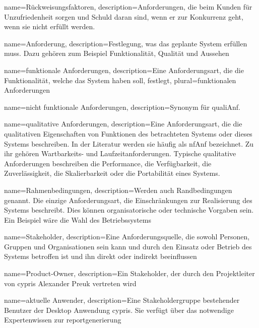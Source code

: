  {
	name=R\"uckweisungsfaktoren,
	description={Anforderungen, die beim Kunden f\"ur Unzufriedenheit sorgen und Schuld daran sind, wenn er zur Konkurrenz geht, wenn sie nicht erf\"ullt werden.}}

 {
	name=Anforderung,
	description={Festlegung, was das geplante System erf\"ullen muss. Dazu geh\"oren zum Beispiel Funktionalit\"at, Qualit\"at und Aussehen}}
	
 {
	name=funktionale Anforderungen,
	description={Eine Anforderungsart, die die Funktionalit\"at, welche das System haben soll, festlegt},
	plural=funktionalen Anforderungen}

 {
	name=nicht funktionale Anforderungen,
	description={Synonym f\"ur \gls{qualiAnf}.}}

 {
	name=qualitative Anforderungen,
	description={Eine Anforderungsart, die die qualitativen Eigenschaften von Funktionen des betrachteten Systems oder dieses Systems beschreiben. In der Literatur werden sie h\"aufig als \gls{nfAnf} bezeichnet.	Zu ihr geh\"oren Wartbarkeits- und Laufzeitanforderungen. Typische qualitative Anforderungen
beschreiben die Performance, die Verf\"ugbarkeit, die Zuverl\"assigkeit, die Skalierbarkeit oder die Portabilit\"at eines Systems.}}

 {
	name=Rahmenbedingungen,
	description={Werden auch Randbedingungen genannt. Die einzige Anforderungsart, die Einschr\"ankungen zur Realisierung des Systems beschreibt. Dies k\"onnen organisatorische oder technische Vorgaben sein. Ein Beispiel w\"are die Wahl des Betriebssystems}}
		
 {
	name=Stakeholder,
	description={Eine Anforderungsquelle, die sowohl Personen, Gruppen und Organisationen sein kann und durch den Einsatz oder Betrieb des Systems betroffen ist und ihn direkt oder indirekt beeinflussen}}
	
 {
	name=Product-Owner,
	description={Ein Stakeholder, der durch den Projektleiter von \gls{cypris} Alexander Preuk vertreten wird}}
	
 {
	name=aktuelle Anwender,
	description={Eine Stakeholdergruppe bestehender Benutzer der Desktop Anwendung \gls{cypris}. Sie verf\"ugt \"uber das notwendige Expertenwissen zur \gls{report}generierung}}
	
